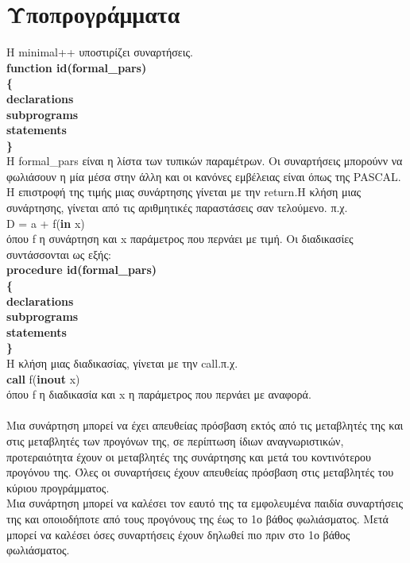 \documentclass[12pt,a4paper,a4paper]{report}
\begin{document}
\section{Υποπρογράμματα}
Η minimal++ υποστιρίζει συναρτήσεις.\\
\textbf{function id(formal\_pars)\\\{\\\hspace*{10mm}declarations\\\hspace*{10mm}subprograms\\\hspace*{10mm}statements\\\}}\\
H formal\_pars είναι η λίστα των τυπικών παραμέτρων. Οι συναρτήσεις μπορούνν να φωλιάσουν η μία μέσα στην άλλη και οι κανόνες εμβέλειας είναι όπως της PASCAL. Η επιστροφή της τιμής μιας συνάρτησης γίνεται με την return.H κλήση μιας συνάρτησης, γίνεται από τις αριθμητικές παραστάσεις σαν τελούμενο. π.χ.\\
D =  a + f(\textbf{in} x)\\
όπου f η συνάρτηση και x παράμετρος που περνάει με τιμή. Οι διαδικασίες συντάσσονται ως εξής:\\
\textbf{procedure id(formal\_pars)\\\{\\\hspace*{10mm}declarations\\\hspace*{10mm}subprograms\\\hspace*{10mm}statements\\\}}\\
H κλήση μιας διαδικασίας, γίνεται με την call.π.χ.\\
\textbf{call} f(\textbf{inout} x)\\
όπου f η διαδικασία και x η παράμετρος που περνάει με αναφορά.\\
\\
Μια συνάρτηση μπορεί να έχει απευθείας πρόσβαση εκτός από τις μεταβλητές της και στις μεταβλητές των προγόνων της, σε περίπτωση ίδιων αναγνωριστικών, προτεραιότητα έχουν οι μεταβλητές της συνάρτησης και μετά του κοντινότερου προγόνου της. Όλες οι συναρτήσεις έχουν απευθείας πρόσβαση στις μεταβλητές του κύριου προγράμματος.\\
Μια συνάρτηση μπορεί να καλέσει τον εαυτό της τα εμφολευμένα παιδία συναρτήσεις της και οποιοδήποτε από τους προγόνους της έως το 1ο βάθος φωλιάσματος. Μετά μπορεί να καλέσει όσες συναρτήσεις έχουν δηλωθεί πιο πριν στο 1ο βάθος φωλιάσματος.\\
\end{document}
